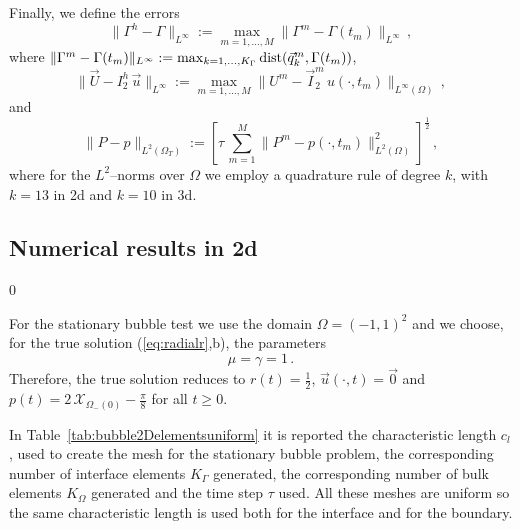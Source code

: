 \documentclass[a4paper,12pt,onecolumn]{article}
\newcommand{\bigchi}{\ensuremath{\mathrm{\mathcal{X}}}}
\newcommand{\charfcn}[1]{\bigchi_{#1}} %
\newcommand{\errorXx}{\|\Gamma^h - \Gamma\|_{L^\infty}}
\newcommand{\errorUu}[1]{\|\vec U - I^h_{#1}\,\vec u\|_{L^\infty}}
\newcommand{\LerrorPp}{\|P - p\|_{L^2(\Omega_T)}}
\begin{document}
Finally, we define the errors
\begin{equation} \label{eq:errorXx}
\errorXx := \max_{m=1,\ldots, M} \|\Gamma^m - \Gamma(t_m)\|_{L^\infty}\,,
\end{equation}
where $\|\Gamma^m - \Gamma(t_m)\|_{L^\infty} :=
\max_{k=1,\ldots, K_\Gamma} {\rm dist}( \vec{q}^m_k, \Gamma(t_m))$,
\begin{equation*}
\errorUu2 := \max_{m=1,\ldots, M}\|U^m - \vec
I^m_2\,u(\cdot,t_m)\|_{L^\infty(\Omega)}\,,
\end{equation*}
and
\begin{equation*}
\LerrorPp := \left[\tau\,\sum_{m=1}^M \|P^m - p(\cdot,t_m)\|_{L^2(\Omega)}^2
\right]^\frac12\,,
\end{equation*}
where for the $L^2$--norms over $\Omega$ we employ a quadrature rule of degree
$k$, with $k=13$ in 2d and $k=10$ in 3d.

\subsection{Numerical results in 2d} \label{subsec:numerical_results_2d}
\setcounter{equation} 0

For the stationary bubble test we use the domain $\Omega = (-1,1)^2$ and we
choose, for the true solution (\ref{eq:radialr},b), the parameters
\begin{equation*}
\mu = \gamma = 1\,.
\end{equation*}
Therefore, the true solution reduces to $r(t) = \frac{1}{2}$, $\vec u(\cdot, t)
= \vec 0$ and $p(t) = 2\,\charfcn{\Omega_-(0)} - \frac{\pi}{8}$ for all $t \geq
0$.

In Table~\ref{tab:bubble2Delementsuniform} it is reported the characteristic
length $c_l$, used to create the mesh for the stationary bubble problem, the
corresponding number of interface elements $K_\Gamma$ generated, the
corresponding number of bulk elements $K_\Omega$ generated and the time step
$\tau$ used. All these meshes are uniform so the same characteristic length is
used both for the interface and for the boundary.
\end{document}
